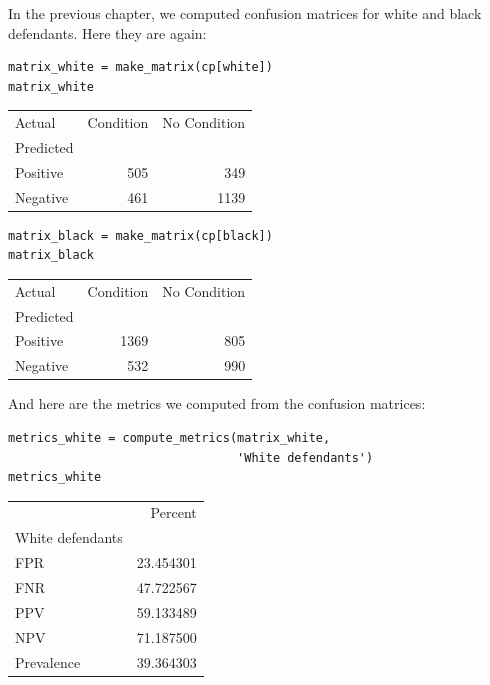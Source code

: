 In the previous chapter, we computed confusion matrices for white and
black defendants. Here they are again:

\begin{lstlisting}[]
matrix_white = make_matrix(cp[white])
matrix_white
\end{lstlisting}

\begin{tabular}{lrr}
\midrule
Actual &  Condition &  No Condition \\
Predicted &            &               \\
\midrule
Positive  &        505 &           349 \\
Negative  &        461 &          1139 \\
\midrule
\end{tabular}

\begin{lstlisting}[]
matrix_black = make_matrix(cp[black])
matrix_black
\end{lstlisting}

\begin{tabular}{lrr}
\midrule
Actual &  Condition &  No Condition \\
Predicted &            &               \\
\midrule
Positive  &       1369 &           805 \\
Negative  &        532 &           990 \\
\midrule
\end{tabular}

And here are the metrics we computed from the confusion matrices:

\begin{lstlisting}[]
metrics_white = compute_metrics(matrix_white, 
                                'White defendants')
metrics_white
\end{lstlisting}

\begin{tabular}{lr}
\midrule
{} &    Percent \\
White defendants &            \\
\midrule
FPR              &  23.454301 \\
FNR              &  47.722567 \\
PPV              &  59.133489 \\
NPV              &  71.187500 \\
Prevalence       &  39.364303 \\
\midrule
\end{tabular}

